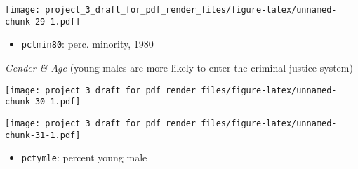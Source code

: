 \documentclass[]{article}
\newenvironment{Shaded}{\begin{snugshade}}{\end{snugshade}}
\newcommand{\DataTypeTok}[1]{\textcolor[rgb]{0.13,0.29,0.53}{#1}}
\newcommand{\DecValTok}[1]{\textcolor[rgb]{0.00,0.00,0.81}{#1}}
\newcommand{\KeywordTok}[1]{\textcolor[rgb]{0.13,0.29,0.53}{\textbf{#1}}}
\newcommand{\NormalTok}[1]{#1}
\newcommand{\OperatorTok}[1]{\textcolor[rgb]{0.81,0.36,0.00}{\textbf{#1}}}
\newcommand{\StringTok}[1]{\textcolor[rgb]{0.31,0.60,0.02}{#1}}
\providecommand{\tightlist}{%
  \setlength{\itemsep}{0pt}\setlength{\parskip}{0pt}}
\begin{document}
\texttt{[image: project\_3\_draft\_for\_pdf\_render\_files/figure-latex/unnamed-chunk-29-1.pdf]}

\begin{itemize}
\tightlist
\item
  \texttt{pctmin80}: perc. minority, 1980
\end{itemize}

\emph{Gender \& Age} (young males are more likely to enter the criminal
justice system)

\begin{Shaded}
\end{Shaded}

\texttt{[image: project\_3\_draft\_for\_pdf\_render\_files/figure-latex/unnamed-chunk-30-1.pdf]}

\begin{Shaded}
\end{Shaded}

\texttt{[image: project\_3\_draft\_for\_pdf\_render\_files/figure-latex/unnamed-chunk-31-1.pdf]}

\begin{itemize}
\tightlist
\item
  \texttt{pctymle}: percent young male
\end{itemize}
\end{document}
